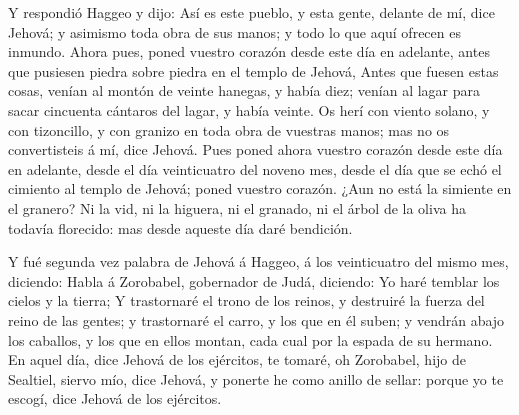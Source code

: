  Y respondió Haggeo y dijo: Así es este pueblo, y esta
gente, delante de mí, dice Jehová; y asimismo toda obra de sus manos; y
todo lo que aquí ofrecen es inmundo.  Ahora pues, poned
vuestro corazón desde este día en adelante, antes que pusiesen piedra
sobre piedra en el templo de Jehová,  Antes que fuesen
estas cosas, venían al montón de veinte hanegas, y había diez; venían al
lagar para sacar cincuenta cántaros del lagar, y había veinte.
 Os herí con viento solano, y con tizoncillo, y con granizo
en toda obra de vuestras manos; mas no os convertisteis á mí, dice
Jehová.  Pues poned ahora vuestro corazón desde este día en
adelante, desde el día veinticuatro del noveno mes, desde el día que se
echó el cimiento al templo de Jehová; poned vuestro corazón.
 ¿Aun no está la simiente en el granero? Ni la vid, ni la
higuera, ni el granado, ni el árbol de la oliva ha todavía florecido:
mas desde aqueste día daré bendición.

 Y fué segunda vez palabra de Jehová á Haggeo, á los
veinticuatro del mismo mes, diciendo:  Habla á Zorobabel,
gobernador de Judá, diciendo: Yo haré temblar los cielos y la tierra;
 Y trastornaré el trono de los reinos, y destruiré la
fuerza del reino de las gentes; y trastornaré el carro, y los que en él
suben; y vendrán abajo los caballos, y los que en ellos montan, cada
cual por la espada de su hermano.  En aquel día, dice
Jehová de los ejércitos, te tomaré, oh Zorobabel, hijo de Sealtiel,
siervo mío, dice Jehová, y ponerte he como anillo de sellar: porque yo
te escogí, dice Jehová de los ejércitos.
